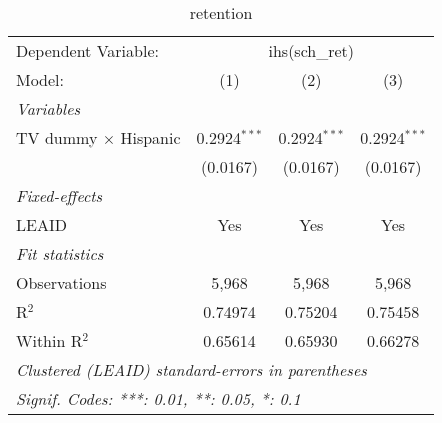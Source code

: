 \begin{table}[htbp]
\centering
\caption{retention}
\begin{tabular}{lccc}
\tabularnewline\midrule\midrule
Dependent Variable:&\multicolumn{3}{c}{ihs(sch\_ret)}\\
Model:&(1) & (2) & (3)\\
\midrule \emph{Variables}&   &   &  \\
TV dummy $\times$ Hispanic & 0.2924$^{***}$ & 0.2924$^{***}$ & 0.2924$^{***}$\\
  &(0.0167) & (0.0167) & (0.0167)\\
\midrule \emph{Fixed-effects}&   &   &  \\
LEAID & Yes & Yes & Yes\\
\midrule \emph{Fit statistics}&  & & \\
Observations & 5,968&5,968&5,968\\
R$^2$ & 0.74974&0.75204&0.75458\\
Within R$^2$ & 0.65614&0.65930&0.66278\\
\midrule\midrule\multicolumn{4}{l}{\emph{Clustered (LEAID) standard-errors in parentheses}}\\
\multicolumn{4}{l}{\emph{Signif. Codes: ***: 0.01, **: 0.05, *: 0.1}}\\
\end{tabular}
\end{table}


